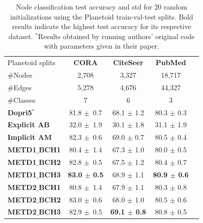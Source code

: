 \documentclass[12pt]{article}
\begin{document}
\begin{table}[t]
\caption{Node classification test accuracy and std for 20 random initializations using the Planetoid train-val-test splits. Bold results indicate the highest test accuracy for its respective dataset. \textbf{$^*$}Results obtained by running authors' original code with parameters given in their paper.}
\vskip 0.15in
\begin{center}
\begin{small}
\begin{sc}
\begin{tabular}{lcccr}
\hline
  Planetoid splits & \bf CORA & \bf CiteSeer & \bf PubMed \\
  $\#$Nodes & 2,708 &  3,327 &  18,717 \\
  $\#$Edges & 5,278 &  4,676 &  44,327 \\ 
  $\#$Classes & 7 &  6 &  3 \\[0.5ex]
\hline
\bf Dopri5$^*$ & 81.8 $\pm$ \,0.7 & 68.1 $\pm$ 1.2 & 80.3 $\pm$ 0.3 \\ 
\bf Explicit AB & 32.0 $\pm$ \,1.9 & 30.1 $\pm$ 1.8 & 31.1 $\pm$ 1.9 \\
\bf Implicit AM & 82.3 $\pm$ \,0.6 & 69.0 $\pm$ 0.7 & 80.5 $\pm$ 0.4 \\
\hline
 \bf METD1$\_$BCH1 & 80.4 $\pm$ \,1.4 & 67.3 $\pm$ 1.0 & 80.0 $\pm$ 0.5 \\
 \bf METD1$\_$BCH2 & 82.8 $\pm$ \,0.5 & 67.5 $\pm$ 1.2 & 80.4 $\pm$ 0.7 \\
 \bf METD1$\_$BCH3 & \textbf{83.0 $\pm$ 0.5} & 68.9 $\pm$ 1.1 & \textbf{80.9 $\pm$ 0.6} \\
 \bf METD2$\_$BCH1 & 80.8 $\pm$ \,1.4 & 67.9 $\pm$ 1.1 & 80.3 $\pm$ 0.8\\
 \bf METD2$\_$BCH2 & 83.0 $\pm$ \,0.6 & 68.0 $\pm$ 1.0 & 80.5 $\pm$ 0.6\\
 \bf METD2$\_$BCH3 & 82.9 $\pm$ \,0.5 & \textbf{69.1 $\pm$ 0.8} & 80.8 $\pm$ 0.5\\
\hline
\end{tabular}
\end{sc}
\end{small}
\end{center}
\vskip -0.1in
\label{tab:GNN_ETD}
\end{table}
\end{document}
